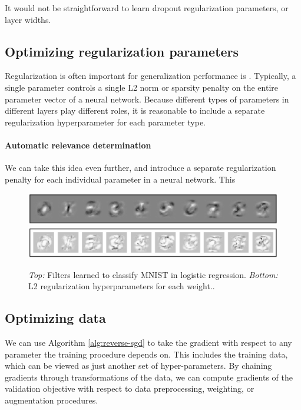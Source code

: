\documentclass{article}
\begin{document}
It would not be straightforward to learn dropout regularization parameters, or layer widths.

\subsection{Optimizing regularization parameters}

Regularization is often important for generalization performance is .
Typically, a single parameter controls a single L2 norm or sparsity penalty on the entire parameter vector of a neural network.
Because different types of parameters in different layers play different roles, it is reasonable to include a separate regularization hyperparameter for each parameter type.

\paragraph{Automatic relevance determination}
We can take this idea even further, and introduce a separate regularization penalty for each individual parameter in a neural network.
This

\begin{figure}[h!]
\begin{center}
\includegraphics[width=\columnwidth]{../experiments/Jan_21_nn_ard/2/weights.pdf}
\includegraphics[width=\columnwidth]{../experiments/Jan_21_nn_ard/2/penalties.pdf}
\caption{\emph{Top:} Filters learned to classify MNIST in logistic regression.
\emph{Bottom:} L2 regularization hyperparameters for each weight..}
\label{fig:logistic ard}
\end{center}
\end{figure} 


\subsection{Optimizing data}

We can use Algorithm \ref{alg:reverse-sgd} to take the gradient with respect to any parameter the training procedure depends on.
This includes the training data, which can be viewed as just another set of hyper-parameters.
By chaining gradients through transformations of the data, we can compute gradients of the validation objective with respect to data preprocessing, weighting, or augmentation procedures.
\end{document}
